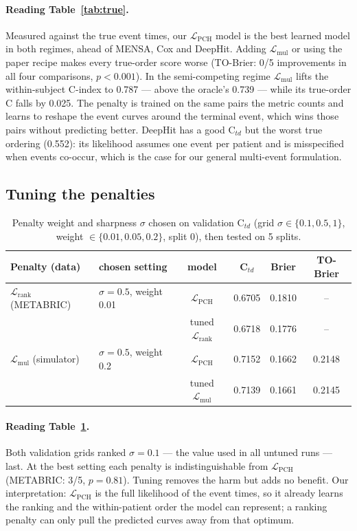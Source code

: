 \documentclass[11pt,a4paper]{article}
\newcommand{\Lpch}{$\mathcal{L}_{\mathrm{PCH}}$}
\newcommand{\Lrank}{$\mathcal{L}_{\mathrm{rank}}$}
\newcommand{\Lmul}{$\mathcal{L}_{\mathrm{mul}}$}
\newcommand{\Ctd}{C$_{td}$}
\begin{document}
\paragraph{Reading Table~\ref{tab:true}.} Measured against the true event times, our \Lpch{} model is the best learned
model in both regimes, ahead of MENSA, Cox and DeepHit. Adding \Lmul{} or using the paper recipe makes every true-order
score worse (TO-Brier: 0/5 improvements in all four comparisons, $p<0.001$). In the semi-competing regime \Lmul{} lifts
the within-subject C-index to 0.787 --- above the oracle's 0.739 --- while its true-order C falls by 0.025. The penalty
is trained on the same pairs the metric counts and learns to reshape the event curves around the terminal event,
which wins those pairs without predicting better. DeepHit has a good \Ctd{} but the worst true ordering (0.552): its
likelihood assumes one event per patient and is misspecified when events co-occur, which is the case for our
general multi-event formulation.

\subsection{Tuning the penalties}\label{sec:tune}
\begin{table}[H]\centering\small
\caption{Penalty weight and sharpness $\sigma$ chosen on validation \Ctd{} (grid $\sigma\in\{0.1,0.5,1\}$,
weight $\in\{0.01,0.05,0.2\}$, split 0), then tested on 5 splits.}
\label{tab:tune}
\begin{tabular}{llcccc}
\toprule
Penalty (data) & chosen setting & model & \Ctd{} & Brier & TO-Brier \\
\midrule
\Lrank{} (METABRIC) & $\sigma{=}0.5$, weight 0.01 & \Lpch{} & 0.6705 & 0.1810 & -- \\
 & & tuned \Lrank{} & 0.6718 & 0.1776 & -- \\
\Lmul{} (simulator) & $\sigma{=}0.5$, weight 0.2 & \Lpch{} & 0.7152 & 0.1662 & 0.2148 \\
 & & tuned \Lmul{} & 0.7139 & 0.1661 & 0.2145 \\
\bottomrule
\end{tabular}
\end{table}

\paragraph{Reading Table~\ref{tab:tune}.} Both validation grids ranked $\sigma=0.1$ --- the value used in all
untuned runs --- last. At the best setting each penalty is indistinguishable from \Lpch{} (METABRIC: 3/5, $p=0.81$).
Tuning removes the harm but adds no benefit. Our interpretation: \Lpch{} is the full likelihood of the event times,
so it already learns the ranking and the within-patient order the model can represent; a ranking penalty can only pull
the predicted curves away from that optimum.
\end{document}
